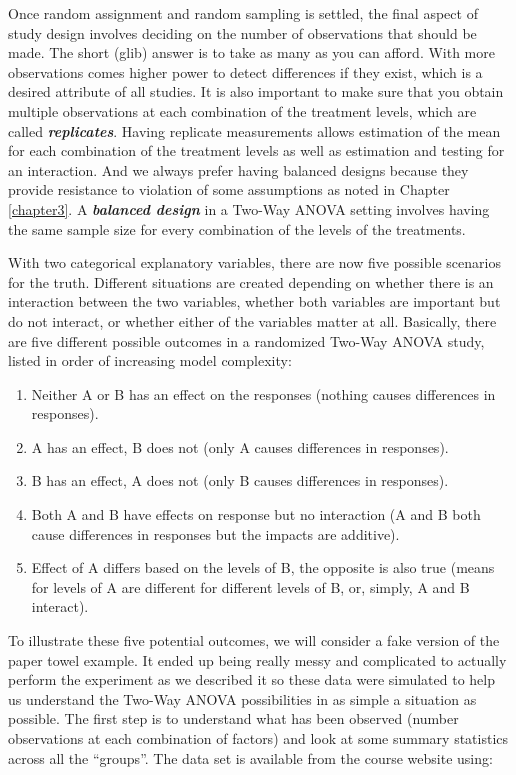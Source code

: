 \documentclass[]{book}
\theoremstyle{definition}
\theoremstyle{definition}
\theoremstyle{remark}
\begin{document}
Once random assignment and random sampling is settled, the final aspect
of study design involves deciding on the number of observations that
should be made. The short (glib) answer is to take as many as you can
afford. With more observations comes higher power to detect differences
if they exist, which is a desired attribute of all studies. It is also
important to make sure that you obtain multiple observations at each
combination of the treatment levels, which are called
\textbf{\emph{replicates}}. Having replicate measurements allows
estimation of the mean for each combination of the treatment levels as
well as estimation and testing for an interaction. And we always prefer
having balanced designs because they provide resistance to violation of
some assumptions as noted in Chapter \ref{chapter3}. A
\textbf{\emph{balanced design}} in a Two-Way ANOVA setting involves
having the same sample size for every combination of the levels of the
treatments.

With two categorical explanatory variables, there are now five possible
scenarios for the truth. Different situations are created depending on
whether there is an interaction between the two variables, whether both
variables are important but do not interact, or whether either of the
variables matter at all. Basically, there are five different possible
outcomes in a randomized Two-Way ANOVA study, listed in order of
increasing model complexity:

\begin{enumerate}
\def\labelenumi{\arabic{enumi}.}
\item
  Neither A or B has an effect on the responses (nothing causes
  differences in responses).
\item
  A has an effect, B does not (only A causes differences in responses).
\item
  B has an effect, A does not (only B causes differences in responses).
\item
  Both A and B have effects on response but no interaction (A and B both
  cause differences in responses but the impacts are additive).
\item
  Effect of A differs based on the levels of B, the opposite is also
  true (means for levels of A are different for different levels of B,
  or, simply, A and B interact).
\end{enumerate}

To illustrate these five potential outcomes, we will consider a fake
version of the paper towel example. It ended up being really messy and
complicated to actually perform the experiment as we described it so
these data were simulated to help us understand the Two-Way ANOVA
possibilities in as simple a situation as possible. The first step is to
understand what has been observed (number observations at each
combination of factors) and look at some summary statistics across all
the ``groups''. The data set is available from the course website using:
\end{document}
